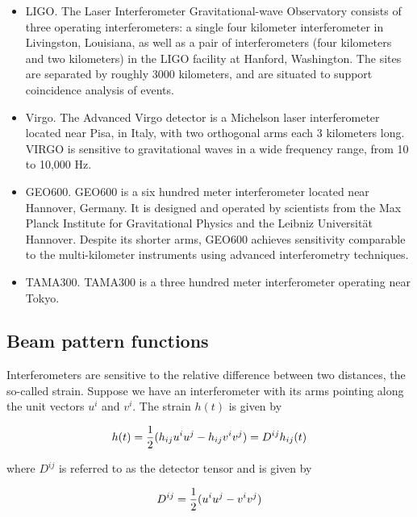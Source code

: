 \documentclass[binding=0.6cm, LaM]{sapthesis}
\begin{document}
		\begin{itemize}
  			\item LIGO. The Laser Interferometer Gravitational-wave Observatory consists of three operating interferometers:
			      a single four kilometer interferometer in Livingston, Louisiana, 
			      as well as a pair of interferometers (four kilometers and two kilometers) in the LIGO facility at Hanford, Washington.
			      The sites are separated by roughly 3000 kilometers, and are situated to support coincidence analysis of events.
  			\item Virgo. The Advanced Virgo detector is a Michelson laser interferometer located near Pisa, 
			      in Italy, with two orthogonal arms each 3 kilometers long. 
			      VIRGO is sensitive to gravitational waves in a wide frequency range, from 10 to 10,000 Hz. 
  			\item GEO600. GEO600 is a six hundred meter interferometer located near Hannover, 
			      Germany. It is designed and operated by scientists from the 
			      Max Planck Institute for Gravitational Physics and the Leibniz Universität Hannover.
 			      Despite its shorter arms, GEO600 achieves sensitivity comparable to 
			      the multi-kilometer instruments using advanced interferometry techniques.
  			\item TAMA300. TAMA300 is a three hundred meter interferometer operating near Tokyo.

\end{itemize}

\subsection{Beam pattern functions}

	Interferometers are sensitive to the relative difference between two distances, the so-called strain.
 	Suppose we have an interferometer with its arms pointing along the unit vectors $u^i$ and $v^i$. The strain $h(t)$ is given by

		\begin{equation}
		h(t) = {1 \over 2} (h_{ij}u^iu^j - h_{ij}v^iv^j) = D^{ij}h_{ij}(t)
		\end{equation}

	where $D^{ij}$ is referred to as the detector tensor and is given by

		\begin{equation}
		D^{ij} = {1\over 2} (u^iu^j -v^iv^j)
		\end{equation}
\end{document}

